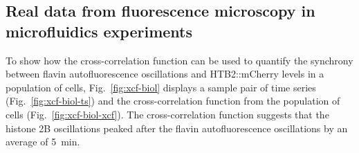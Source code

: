 \subsection{Real data from fluorescence microscopy in microfluidics experiments}
\label{subsubsec:analysis-correlation-real}

To show how the cross-correlation function can be used to quantify the synchrony between flavin autofluorescence oscillations and HTB2::mCherry levels in a population of cells, Fig.\ \ref{fig:xcf-biol} displays a sample pair of time series (Fig.\ \ref{fig:xcf-biol-ts}) and the cross-correlation function from the population of cells (Fig.\ \ref{fig:xcf-biol-xcf}).
The cross-correlation function suggests that the histone 2B oscillations peaked after the flavin autofluorescence oscillations by an average of \SI{5}{\minute}.

